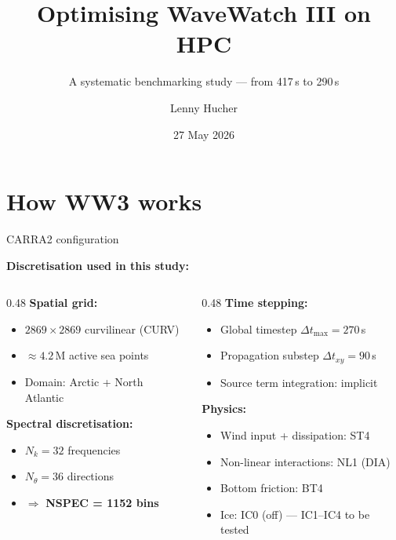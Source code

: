 \documentclass[aspectratio=169,10pt]{beamer}
\title{Optimising WaveWatch III on HPC}
\subtitle{A systematic benchmarking study — from 417\,s to 290\,s}
\author{Lenny Hucher}
\institute{PhD student, MET Norway}
\date{27 May 2026}
\begin{document}

\maketitle

\section{How WW3 works}

\begin{frame}{CARRA2 configuration}

  \textbf{Discretisation used in this study:}
  \begin{columns}[T]
    \begin{column}{0.48\textwidth}
      \textbf{Spatial grid:}
      \begin{itemize}
        \item $2869\!\times\!2869$ curvilinear (CURV)
        \item $\approx\!4.2$\,M active sea points
        \item Domain: Arctic + North Atlantic
      \end{itemize}

      \vspace{0.5em}
      \textbf{Spectral discretisation:}
      \begin{itemize}
        \item $N_k = 32$ frequencies
        \item $N_\theta = 36$ directions
        \item $\Rightarrow$ \textbf{NSPEC = 1152 bins}
      \end{itemize}
    \end{column}
    \begin{column}{0.48\textwidth}
      \textbf{Time stepping:}
      \begin{itemize}
        \item Global timestep $\Delta t_{\max} = 270$\,s
        \item Propagation substep $\Delta t_{xy} = 90$\,s
        \item Source term integration: implicit
      \end{itemize}

      \vspace{0.5em}
      \textbf{Physics:}
      \begin{itemize}
        \item Wind input + dissipation: ST4
        \item Non-linear interactions: NL1 (DIA)
        \item Bottom friction: BT4
        \item Ice: IC0 (off) --- IC1--IC4 to be tested
      \end{itemize}
    \end{column}
  \end{columns}
\end{frame}
\end{document}
